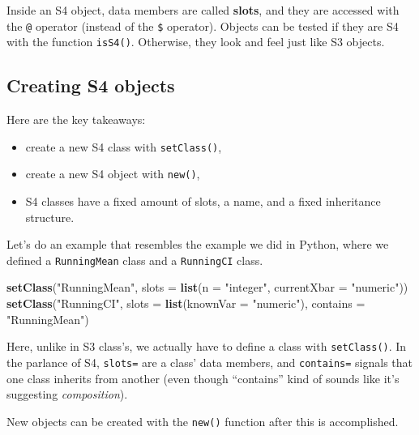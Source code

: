 \documentclass[12pt,krantz2]{krantz}
\makeatletter
\newenvironment{Shaded}{\begin{snugshade}}{\end{snugshade}}
\newcommand{\DataTypeTok}[1]{\textcolor[rgb]{0.27,0.27,0.27}{#1}}
\newcommand{\KeywordTok}[1]{\textcolor[rgb]{0.27,0.27,0.27}{\textbf{#1}}}
\newcommand{\NormalTok}[1]{#1}
\newcommand{\StringTok}[1]{\textcolor[rgb]{0.5,0.5,0.5}{#1}}
\providecommand{\tightlist}{%
  \setlength{\itemsep}{0pt}\setlength{\parskip}{0pt}}
\newenvironment{kframe}{%
\medskip{}
\setlength{\fboxsep}{.8em}
 \def\at@end@of@kframe{}%
 \ifinner\ifhmode%
  \def\at@end@of@kframe{\end{minipage}}%
  \begin{minipage}{\columnwidth}%
 \fi\fi%
 \def\FrameCommand##1{\hskip\@totalleftmargin \hskip-\fboxsep
 \colorbox{shadecolor}{##1}\hskip-\fboxsep
     \hskip-\linewidth \hskip-\@totalleftmargin \hskip\columnwidth}%
 \MakeFramed {\advance\hsize-\width
   \@totalleftmargin\z@ \linewidth\hsize
   \@setminipage}}%
 {\par\unskip\endMakeFramed%
 \at@end@of@kframe}
\renewenvironment{Shaded}{\begin{kframe}}{\end{kframe}}
\makeatother
\begin{document}
Inside an S4 object, data members are called \textbf{slots}, and they are accessed with the \texttt{@} operator (instead of the \texttt{\$} operator). Objects can be tested if they are S4 with the function \texttt{isS4()}. Otherwise, they look and feel just like S3 objects.

\hypertarget{creating-s4-objects}{%
\subsection{Creating S4 objects}\label{creating-s4-objects}}

Here are the key takeaways:

\begin{itemize}
\tightlist
\item
  create a new S4 class with \texttt{setClass()},
\item
  create a new S4 object with \texttt{new()},
\item
  S4 classes have a fixed amount of slots, a name, and a fixed inheritance structure.
\end{itemize}

Let's do an example that resembles the example we did in Python, where we defined a \texttt{RunningMean} class and a \texttt{RunningCI} class.

\begin{Shaded}
\begin{Highlighting}[]
\KeywordTok{setClass}\NormalTok{(}\StringTok{"RunningMean"}\NormalTok{,}
         \DataTypeTok{slots =} \KeywordTok{list}\NormalTok{(}\DataTypeTok{n =} \StringTok{"integer"}\NormalTok{, }
                      \DataTypeTok{currentXbar =} \StringTok{"numeric"}\NormalTok{))}
\KeywordTok{setClass}\NormalTok{(}\StringTok{"RunningCI"}\NormalTok{,}
         \DataTypeTok{slots =} \KeywordTok{list}\NormalTok{(}\DataTypeTok{knownVar =} \StringTok{"numeric"}\NormalTok{),}
         \DataTypeTok{contains =} \StringTok{"RunningMean"}\NormalTok{)}
\end{Highlighting}
\end{Shaded}

Here, unlike in S3 class's, we actually have to define a class with \texttt{setClass()}. In the parlance of S4, \texttt{slots=} are a class' data members, and \texttt{contains=} signals that one class inherits from another (even though ``contains'' kind of sounds like it's suggesting \emph{composition}).

New objects can be created with the \texttt{new()} function after this is accomplished.
\end{document}
